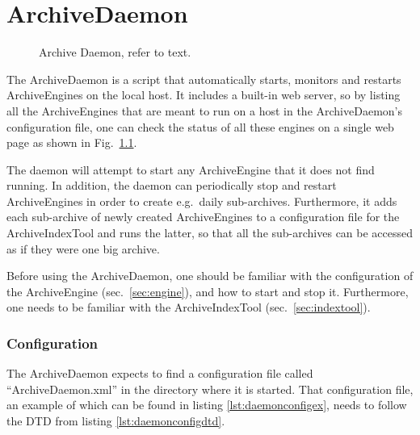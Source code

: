 \chapter{ArchiveDaemon}
\begin{figure}[htb]
\begin{center}
\end{center}
\caption{\label{fig:daemon}Archive Daemon, refer to text.}
\end{figure}

\noindent The ArchiveDaemon is a script that automatically starts,
monitors and restarts ArchiveEngines on the local host. It includes a
built-in web server, so by listing all the ArchiveEngines that are
meant to run on a host in the ArchiveDaemon's configuration file, one
can check the status of all these engines on a single web page as
shown in Fig.~\ref{fig:daemon}.

The daemon will attempt to start any ArchiveEngine that it does not
find running. In addition, the daemon can periodically stop and
restart ArchiveEngines in order to create e.g.\ daily sub-archives.
Furthermore, it adds each sub-archive of newly created ArchiveEngines
to a configuration file for the ArchiveIndexTool and runs the latter,
so that all the sub-archives can be accessed as if they were one big archive.

Before using the ArchiveDaemon, one should be familiar
with the configuration of the ArchiveEngine (sec.\ \ref{sec:engine}),
and how to start and stop it. Furthermore, one needs to be familiar
with the ArchiveIndexTool (sec.\ \ref{sec:indextool}).

\subsection{Configuration}
The ArchiveDaemon expects to find a configuration file called
``ArchiveDaemon.xml'' in the directory where it is started.  That
configuration file, an example of which can be found in listing
\ref{lst:daemonconfigex}, needs to follow the DTD from listing
\ref{lst:daemonconfigdtd}.





